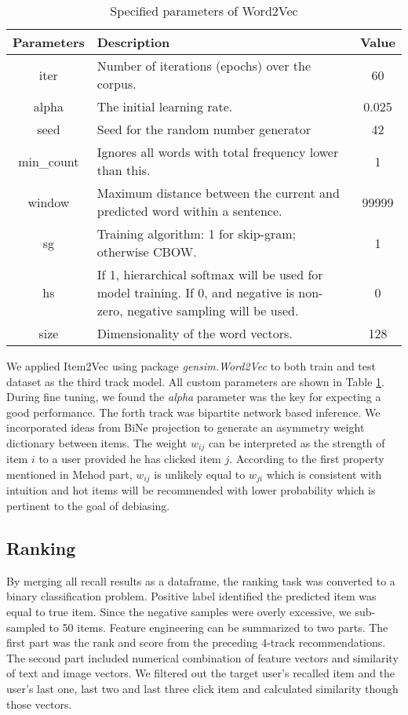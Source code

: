 \documentclass[manuscript,noacm]{acmart}
\begin{document}
\begin{table}[H]
\caption{Specified parameters of Word2Vec}

\begin{tabular}{c p{8cm} c}
\toprule
Parameters    & Description & Value \\
\midrule
iter          & Number of iterations (epochs) over the corpus. & 60    \\
alpha         & The initial learning rate. & 0.025 \\
seed          & Seed for the random number generator & 42    \\
min\_count    & Ignores all words with total frequency lower than this. & 1     \\
window        & Maximum distance between the current and predicted word within a sentence. & 99999 \\
sg & Training algorithm: 1 for skip-gram; otherwise CBOW.& 1     \\
hs & If 1, hierarchical softmax will be used for model training. If 0, and negative is non-zero, negative sampling will be used. & 0     \\
size & Dimensionality of the word vectors.& 128  \\
\bottomrule
\end{tabular}
\label{w2v}
\end{table}
We applied Item2Vec using package \textit{gensim.Word2Vec} to both train and test dataset as the third track model. All custom parameters are shown in Table \ref{w2v}. During fine tuning, we found the \textit{alpha} parameter was the key for expecting a good performance. The forth track was bipartite network based inference. We incorporated ideas from BiNe projection to generate an asymmetry weight dictionary between items. The weight $w_{ij}$ can be interpreted as the strength of item $i$ to a user provided he has clicked item $j$. According to the first property mentioned in Mehod part, $w_{ij}$ is unlikely equal to $w_{ji}$ which is consistent with intuition and hot items will be recommended with lower probability which is pertinent to the goal of debiasing.



\subsection{Ranking}

By merging all recall results as a dataframe, the ranking task was converted to a binary classification problem. Positive label identified the predicted item was equal to true item. Since the negative samples were overly excessive, we sub-sampled to 50 items. Feature engineering can be summarized to two parts. The first part was the rank and score from the preceding 4-track recommendations. The second part included numerical combination of feature vectors and similarity of text and image vectors. We filtered out the target user’s recalled item and the user’s last one, last two and last three click item and calculated similarity though those vectors.
\end{document}
